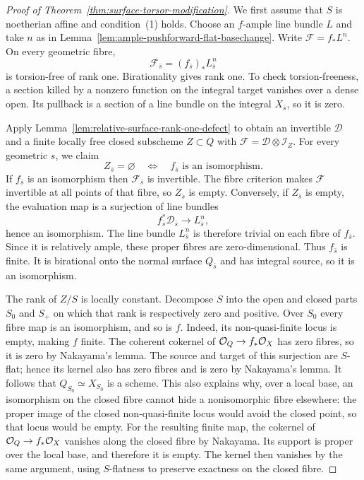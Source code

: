 \begin{proof}[Proof of Theorem~\ref{thm:surface-torsor-modification}]
We first assume that $S$ is noetherian affine and condition~(1) holds.
Choose an $f$-ample line bundle $L$ and take $n$ as in
Lemma~\ref{lem:ample-pushforward-flat-basechange}. Write
$\mathcal F=f_*L^n$. On every geometric fibre,
\[
 \mathcal F_{\bar s}=(f_{\bar s})_*L_{\bar s}^n
\]
is torsion-free of rank one. Birationality gives rank one. To check
torsion-freeness, a section killed by a nonzero function on the
integral target vanishes over a dense open. Its pullback is a section
of a line bundle on the integral $X_{\bar s}$, so it is zero.

Apply Lemma~\ref{lem:relative-surface-rank-one-defect} to obtain an
invertible $\mathcal D$ and a finite locally free closed subscheme
$Z\subset Q$ with $\mathcal F=\mathcal D\otimes\mathcal I_Z$.
For every geometric $s$, we claim
\[
 Z_{\bar s}=\varnothing
 \quad\Longleftrightarrow\quad
 f_{\bar s}\text{ is an isomorphism}.
\]
If $f_{\bar s}$ is an isomorphism then $\mathcal F_{\bar s}$ is
invertible. The fibre criterion makes $\mathcal F$ invertible at
all points of that fibre, so $Z_{\bar s}$ is empty.
Conversely, if $Z_{\bar s}$ is empty, the evaluation map is a
surjection of line bundles
\[
 f_{\bar s}^*\mathcal D_{\bar s}\longrightarrow L_{\bar s}^n,
\]
hence an isomorphism. The line bundle $L_{\bar s}^n$ is therefore
trivial on each fibre of $f_{\bar s}$. Since it is relatively ample,
these proper fibres are zero-dimensional. Thus $f_{\bar s}$ is
finite. It is birational onto the normal surface $Q_{\bar s}$ and
has integral source, so it is an isomorphism.

The rank of $Z/S$ is locally constant. Decompose $S$ into the open
and closed parts $S_0$ and $S_+$ on which that rank is respectively
zero and positive. Over $S_0$ every fibre map is an isomorphism, and
so is $f$. Indeed, its non-quasi-finite locus is empty, making $f$
finite. The coherent cokernel of $\mathcal O_Q\to f_*\mathcal O_X$ has zero fibres,
so it is zero by Nakayama's lemma. The source and target of this
surjection are $S$-flat; hence its kernel also has zero fibres and
is zero by Nakayama's lemma. It follows that $Q_{S_0}\simeq X_{S_0}$
is a scheme. This also explains why, over a local base, an isomorphism
on the closed fibre cannot hide a nonisomorphic fibre elsewhere:
the proper image of the closed non-quasi-finite locus would avoid
the closed point, so that locus would be empty. For the resulting
finite map, the cokernel of $\mathcal O_Q\to f_*\mathcal O_X$ vanishes along the
closed fibre by Nakayama. Its support is proper over the local base,
and therefore it is empty. The kernel then vanishes by the same
argument, using $S$-flatness to preserve exactness on the closed fibre.


\end{proof}
